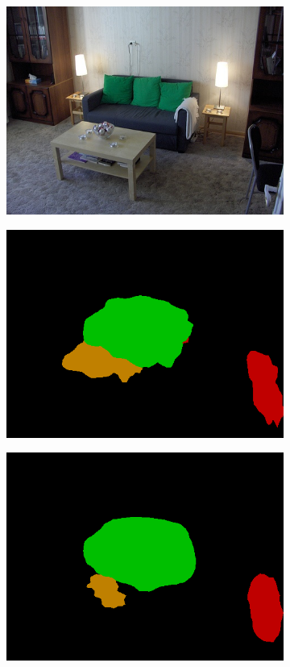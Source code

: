 \documentclass{article} %
\begin{document}
\begin{figure}[t]
  \begin{subfigure}[b]{0.19\linewidth}
    \includegraphics[width=\textwidth]{figs/ab/img/2007_001457}
  \end{subfigure}
  \begin{subfigure}[b]{0.19\linewidth}
    \includegraphics[width=\textwidth]{figs/ab/fcn/2007_001457}
  \end{subfigure}
  \begin{subfigure}[b]{0.19\linewidth}
    \includegraphics[width=\textwidth]{figs/ab/deeplab/2007_001457}

\end{subfigure}
\end{figure}
\end{document}
